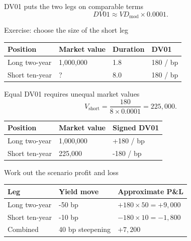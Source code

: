 \documentclass[12pt,aspectratio=169]{beamer}
\begin{document}

\begin{frame}{DV01 puts the two legs on comparable terms}
\[DV01\approx V D_{\mathrm{mod}}\times0.0001.\]
\end{frame}


\begin{frame}{Exercise: choose the size of the short leg}
\begin{center}\begin{tabular}{@{}llll@{}}\toprule \textbf{Position} & \textbf{Market value} & \textbf{Duration} & \textbf{DV01}\\\midrule Long two-year & 1,000,000 & 1.8 & 180 / bp\\[2mm]
Short ten-year & ? & 8.0 & 180 / bp\\\bottomrule\end{tabular}\end{center}
\end{frame}


\begin{frame}{Equal DV01 requires unequal market values}
\[V_{\mathrm{short}}=\frac{180}{8\times0.0001}=225{,}000.\]\begin{center}\begin{tabular}{@{}lll@{}}\toprule \textbf{Position} & \textbf{Market value} & \textbf{Signed DV01}\\\midrule Long two-year & 1,000,000 & +180 / bp\\[2mm]
Short ten-year & 225,000 & -180 / bp\\\bottomrule\end{tabular}\end{center}
\end{frame}


\begin{frame}{Work out the scenario profit and loss}
\begin{center}\begin{tabular}{@{}lll@{}}\toprule \textbf{Leg} & \textbf{Yield move} & \textbf{Approximate P\&L}\\\midrule Long two-year & -50 bp & $+180\times50=+9{,}000$\\[2mm]
Short ten-year & -10 bp & $-180\times10=-1{,}800$\\[2mm]
Combined & 40 bp steepening & $+7{,}200$\\\bottomrule\end{tabular}\end{center}
\end{frame}
\end{document}
